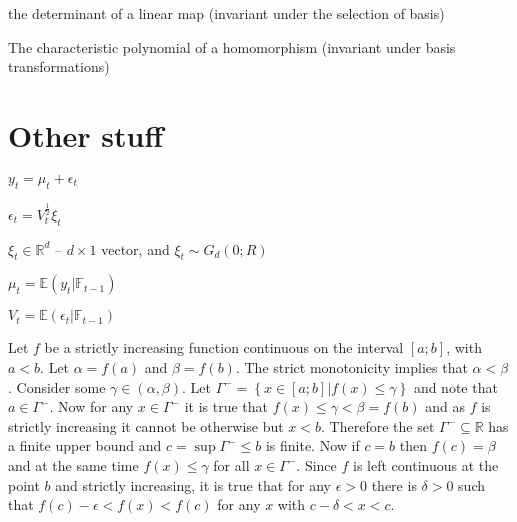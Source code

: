 \documentclass[a4paper]{article}
\newcommand{\obj}[1]{\ensuremath{\left\{ #1 \right\}}}
\newcommand{\cintc}[1]{\ensuremath{\left[ #1 \right]}}
\newcommand{\brac}[1]{\ensuremath{\left( #1 \right)}}
\begin{document}
the determinant of a linear map (invariant under the selection of basis)

The characteristic polynomial of a homomorphism (invariant under basis transformations)


\section{Other stuff} %
\label{sec:unimportant}

$y_t = \mu_t + \epsilon_t$

$\epsilon_t = V_t^{\frac{1}{2}} \xi_t$

$\xi_t \in \mathbb{R}^d$ -- $d\times 1$ vector, and $\xi_t \sim G_d\brac{0; R}$

$\mu_t = \mathbb{E}\brac{y_t \vert \mathbb{F}_{t-1}}$

$V_t = \mathbb{E}\brac{\epsilon_t \vert \mathbb{F}_{t-1}}$


Let $f$ be a strictly increasing function continuous on the interval $\cintc{ a; b}$, with $a<b$. Let $\alpha = f\brac{a}$ and $\beta = f\brac{b}$. The strict monotonicity implies that $\alpha < \beta$. Consider some $\gamma \in \brac{\alpha, \beta}$. Let $\Gamma^- = \obj{x\in \cintc{a ;b}\vert f\brac{x}\leq \gamma}$ and note that $a\in \Gamma^-$. Now for any $x\in \Gamma^-$ it is true that $f\brac{x}\leq\gamma<\beta = f\brac{b}$ and as $f$ is strictly increasing it cannot be otherwise but $x<b$. Therefore the set $\Gamma^-\subseteq \mathbb{R}$ has a finite upper bound and $c = \sup \Gamma^- \leq b$ is finite. Now if $c=b$ then $f\brac{c} = \beta$ and at the same time $f\brac{x}\leq \gamma$ for all $x\in \Gamma^-$. Since $f$ is left continuous at the point $b$ and strictly increasing, it is true that for any $\epsilon>0$ there is $\delta > 0$ such that $f\brac{c} - \epsilon < f\brac{x} < f\brac{c}$ for any $x$ with $c-\delta<x<c$. 




\end{document}

